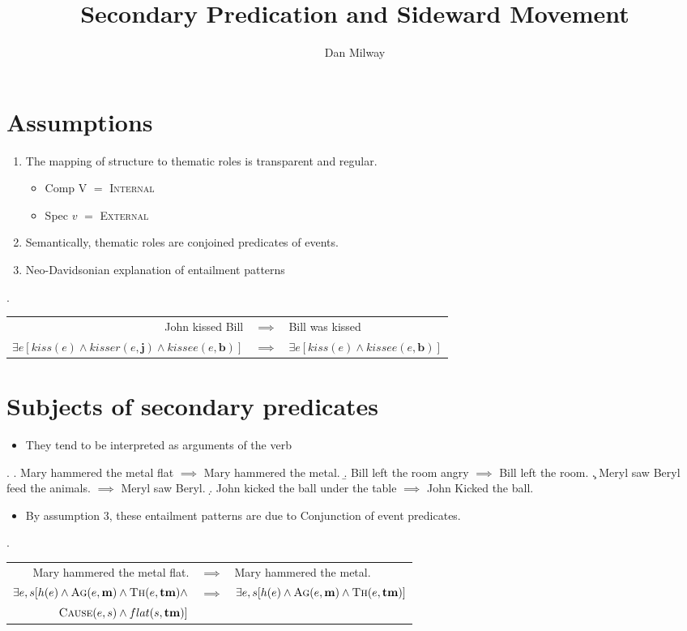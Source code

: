 \documentclass[letterpaper]{article}
\title{Secondary Predication and Sideward Movement}
\author{Dan Milway}
\begin{document}
\maketitle
\section{Assumptions}
\begin{enumerate}
  \item The mapping of structure to thematic roles is transparent and regular.
    \begin{itemize}
      \item Comp V $=$ \textsc{Internal}
      \item Spec $v$ $=$ \textsc{External}
    \end{itemize}
  \item Semantically, thematic roles are conjoined predicates of events.
  \item Neo-Davidsonian explanation of entailment patterns
\end{enumerate}
\ex.
\begin{tabular}[t]{rcl}
  John kissed Bill & $\implies$ & Bill was kissed\\
  $\exists e [kiss(e) \wedge kisser(e,\mathbf{j}) \wedge kissee(e, \mathbf{b})]$ & $\implies$ &$\exists e [kiss(e) \wedge kissee(e, \mathbf{b})]$
\end{tabular}

\section{Subjects of secondary predicates}
\begin{itemize}
  \item They tend to be interpreted as arguments of the verb \parencite{kratzer_building_2004}
\end{itemize}
\ex.
\a. Mary hammered the metal flat $\implies$ Mary hammered the metal.
\b. Bill left the room angry $\implies$ Bill left the room.
\c. Meryl saw Beryl feed the animals. $\implies$ Meryl saw Beryl.
\d. John kicked the ball under the table $\implies$ John Kicked the ball.

\begin{itemize}
  \item By assumption 3, these entailment patterns are due to Conjunction of event predicates.
\end{itemize}
\ex. 
\begin{tabular}[t]{rcl}
  Mary hammered the metal flat. & $\implies$ & Mary hammered the metal.\\
  $\exists e,s[h(e)\wedge \textsc{Ag}(e,\mathbf{m}) \wedge \textsc{Th}(e, \mathbf{tm})\wedge$ & $\implies$ & $\exists e,s[h(e)\wedge \textsc{Ag}(e,\mathbf{m}) \wedge \textsc{Th}(e, \mathbf{tm})]$\\
$\textsc{Cause}(e,s) \wedge flat(s, \mathbf{tm})]$ & & \\
\end{tabular}
\end{document}
